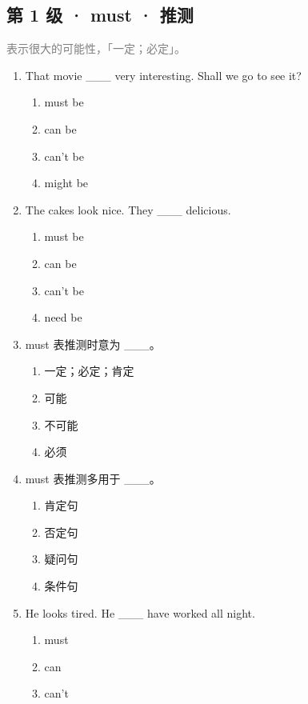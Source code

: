 \documentclass[11pt,a4paper]{ctexart}
\begin{document}
\subsection*{第 1 级 · must · 推测}
\noindent\textcolor{gray}{表示很大的可能性，「一定；必定」。}\par\smallskip
\begin{enumerate}[leftmargin=*,itemsep=4pt]
\item That movie \_\_\_ very interesting. Shall we go to see it?
\begin{enumerate}[label=\Alph*.,leftmargin=2em,itemsep=1pt,topsep=2pt]
\item must be
\item can be
\item can’t be
\item might be
\end{enumerate}
\item The cakes look nice. They \_\_\_ delicious.
\begin{enumerate}[label=\Alph*.,leftmargin=2em,itemsep=1pt,topsep=2pt]
\item must be
\item can be
\item can’t be
\item need be
\end{enumerate}
\item must 表推测时意为 \_\_\_。
\begin{enumerate}[label=\Alph*.,leftmargin=2em,itemsep=1pt,topsep=2pt]
\item 一定；必定；肯定
\item 可能
\item 不可能
\item 必须
\end{enumerate}
\item must 表推测多用于 \_\_\_。
\begin{enumerate}[label=\Alph*.,leftmargin=2em,itemsep=1pt,topsep=2pt]
\item 肯定句
\item 否定句
\item 疑问句
\item 条件句
\end{enumerate}
\item He looks tired. He \_\_\_ have worked all night.
\begin{enumerate}[label=\Alph*.,leftmargin=2em,itemsep=1pt,topsep=2pt]
\item must
\item can
\item can’t

\end{enumerate}
\end{enumerate}
\end{document}
